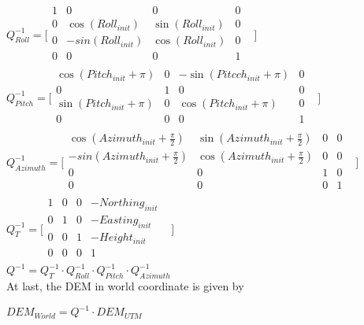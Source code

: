 $Q_{Roll}^{-1}=\lbrack \begin{matrix}
1 & 0 & 0 & 0 & \\
0 & \cos (Roll_{init}) & \sin (Roll_{init}) & 0 & \\
0 & -sin(Roll_{init}) & \cos (Roll_{init}) & 0 & \\
0 & 0 & 0 & 1 & \\
\end{matrix}
\rbrack $\\


$Q_{Pitch}^{-1}=\lbrack \begin{matrix}
\cos (Pitch_{init}+\pi ) & 0 & -\sin (Pitcch_{init}+\pi ) & 0 & \\
0 & 1 & 0 & 0 & \\
\sin (Pitch_{init}+\pi ) & 0 & \cos (Pitch_{init}+\pi ) & 0 & \\
0 & 0 & 0 & 1 & \\
\end{matrix}
\rbrack $\\


$Q_{Azimuth}^{-1}=\lbrack \begin{matrix}
\cos (Azimuth_{init}+\frac{\pi }{2}) & \sin (Azimuth_{init}+\frac{\pi 
}{2}) & 0 & 0 & \\
-sin(Azimuth_{init}+\frac{\pi }{2}) & \cos (Azimuth_{init}+\frac{\pi 
}{2}) & 0 & 0 & \\
0 & 0 & 1 & 0 & \\
0 & 0 & 0 & 1 & \\
\end{matrix}
\rbrack $\\


$Q_{T}^{-1}=\lbrack \begin{matrix}
1 & 0 & 0 & -Northing_{init} & \\
0 & 1 & 0 & -Easting_{init} & \\
0 & 0 & 1 & -Height_{init} & \\
0 & 0 & 0 & 1 & \\
\end{matrix}
\rbrack $\\


$Q^{-1}=Q_{T}^{-1}\cdot Q_{Roll}^{-1}\cdot Q_{Pitch}^{-1}\cdot 
Q_{Azimuth}^{-1}$\\


At last, the DEM in world coordinate is given by

$DEM_{World}=Q^{-1}\cdot DEM_{UTM}$\\
